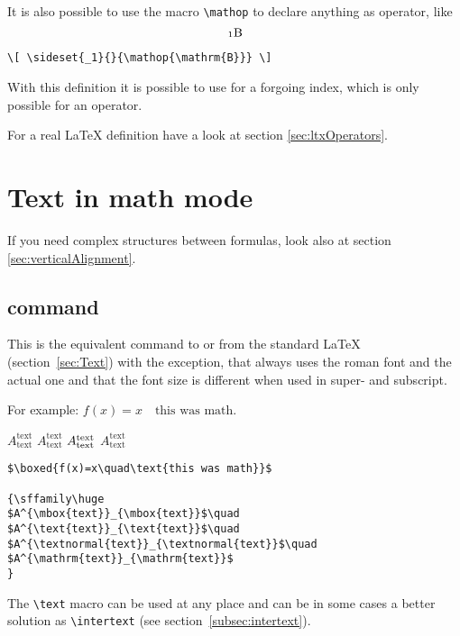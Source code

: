 \begin{table}[htb]
It is also possible to use the macro \verb+\mathop+ to declare anything
as operator, like
\[ \sideset{_1}{}{\mathop{\mathrm{B}}} \]
\begin{lstlisting}
\[ \sideset{_1}{}{\mathop{\mathrm{B}}} \]
\end{lstlisting}
With this definition it is possible to use  for a forgoing index, which
is only possible for an operator.

For a real \LaTeX{} definition have a look at section \vref{sec:ltxOperators}.


\section{Text in math mode}\label{sec:Text-in-math mode}

If you need complex structures between formulas, look also at section \ref{sec:verticalAlignment}.

\subsection{ command}
%
This is the equivalent command to 
or 
from the standard \LaTeX{} (section~\vref{sec:Text}) with the exception, that 
always uses the roman font and  the actual one and that the font size is different
when used in super- and subscript. 

For example: $\boxed{f(x)=x\quad\text{this was math}}$.

\bigskip
{\sffamily\huge
$A^{\mbox{text}}_{\mbox{text}}$\quad
$A^{\text{text}}_{\text{text}}$\quad
$A^{\textnormal{text}}_{\textnormal{text}}$\quad
$A^{\mathrm{text}}_{\mathrm{text}}$
}
\medskip
\begin{lstlisting}
$\boxed{f(x)=x\quad\text{this was math}}$

{\sffamily\huge
$A^{\mbox{text}}_{\mbox{text}}$\quad
$A^{\text{text}}_{\text{text}}$\quad
$A^{\textnormal{text}}_{\textnormal{text}}$\quad
$A^{\mathrm{text}}_{\mathrm{text}}$ 
}
\end{lstlisting}

The \verb+\text+ macro can be used at any place and can be in some cases a better
solution as \verb+\intertext+ (see section~\ref{subsec:intertext}).


\end{table}
